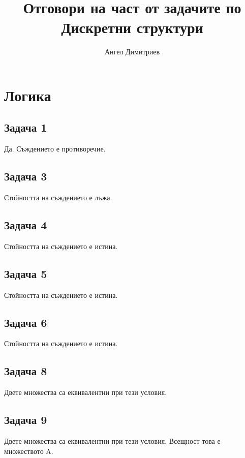 \documentclass[]{article}
\title{Отговори на част от задачите по Дискретни структури}
\author{Ангел Димитриев}
\date{}
\begin{document}
	
	\maketitle
	
	
	\section{Логика}
	
	\subsection*{Задача 1} 
	
	Да. Съждението е противоречие. 
	
	
	\subsection*{Задача 3} 
	
	Стойността на съждението е лъжа.
	
	\subsection*{Задача 4} 
	
	Стойността на съждението е истина.
	
	
	\subsection*{Задача 5}
	
	Стойността на съждението е истина.
	
	
	\subsection*{Задача 6}
	
	Стойността на съждението е истина.
	
	
	\subsection*{Задача 8} 
	
	Двете множества са еквивалентни при тези условия.
	
	
	
	\subsection*{Задача 9} 
	
	Двете множества са еквивалентни при тези условия.
	Всещност това е множеството A.
	
\end{document}
